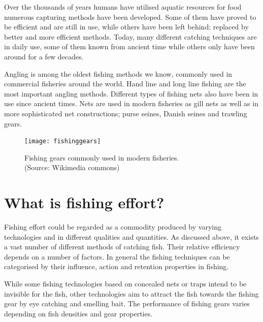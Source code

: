 \documentclass[11pt,fleqn]{book} %
\begin{document}
Over the thousands of years humans have utilised aquatic resources for food numerous capturing methods have been developed. Some of them have proved to be efficient and are still in use, while others have been left behind; replaced by better and more efficient methods. Today, many different catching techniques are in daily use, some of them known from ancient time while others only have been around for a few decades.

Angling is among the oldest fishing methods we know, commonly used in commercial fisheries around the world. Hand line and long line fishing are the most important angling methods. Different types of fishing nets also have been in use since ancient times. Nets are used in modern fisheries as gill nets as well as in more sophisticated net constructions; purse seines, Danish seines and trawling gears.
\begin{figure}[ht]
\centering\texttt{[image: fishinggears]} 
\caption{Fishing gears commonly used in modern fisheries.\\(Source: Wikimedia commons)}
\label{fig:gears}
\end{figure}

\section{What is fishing effort?}
\label{section fishing effort}
Fishing effort could be regarded as a commodity produced by varying technologies and in different qualities and quantities. As discussed above, it exists a vast number of different methods of catching fish. Their relative efficiency depends on a number of factors. In general the fishing techniques can be categorised by their influence, action and retention properties in fishing\cite{Chopin1995}.

While some fishing technologies based on concealed nets or traps intend to be invisible for the fish, other technologies aim to attract the fish towards the fishing gear by eye catching and smelling bait. The performance of fishing gears varies depending on fish densities and gear properties. 
\end{document}
